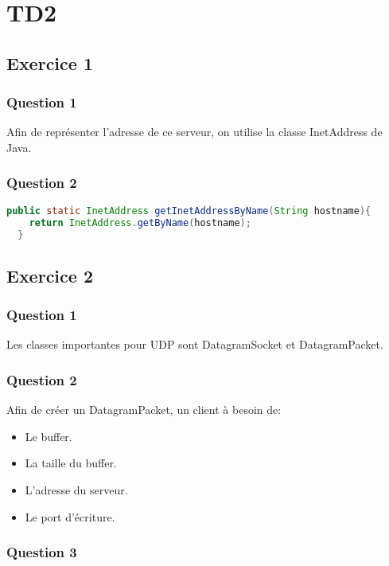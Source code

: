 \section{TD2}

\subsection{Exercice 1}

\subsubsection{Question 1}

Afin de représenter l'adresse de ce serveur, on utilise la classe InetAddress de Java.

\subsubsection{Question 2}

\begin{lstlisting}[language=Java]
  public static InetAddress getInetAddressByName(String hostname){
    return InetAddress.getByName(hostname);
  }
\end{lstlisting}

\subsection{Exercice 2}

\subsubsection{Question 1}

Les classes importantes pour UDP sont DatagramSocket et DatagramPacket.

\subsubsection{Question 2}

Afin de créer un DatagramPacket, un client à besoin de:
\begin{itemize}
  \item Le buffer.
  \item La taille du buffer.
  \item L'adresse du serveur.
  \item Le port d'écriture.
\end{itemize}

\subsubsection{Question 3}

